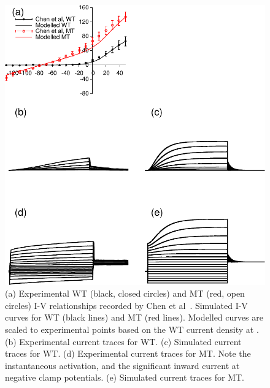 \begin{figure}
\includegraphics{figures/atrium/iks/figures/01_IV}
\caption[KCNQ1 mutation in IKs, experimental data]{
\label{atrium:iks:vc}
(a) Experimental WT (black, closed circles) and MT (red, open circles)
I-V relationships recorded by Chen et al~\cite{Chen2003}.  Simulated I-V curves for WT (black
lines) and MT (red lines).  Modelled curves are scaled to experimental points
based on the WT current density at .
(b) Experimental current traces for WT.
(c) Simulated current traces for WT.
(d) Experimental current traces for MT.  Note the instantaneous
activation, and the significant inward current at negative clamp potentials.
(e) Simulated current traces for MT.
}
\end{figure}

